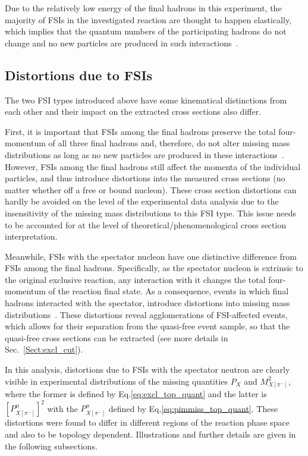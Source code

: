 \documentclass[prc,twocolumn,superscriptaddress,showpacs,amssymb,amsmath,amsfonts,aps,nofootinbib]{revtex4-1}
\begin{document}
Due to the relatively low energy of the final hadrons in this experiment, the majority of FSIs in the investigated reaction are thought to happen elastically, which implies that the quantum numbers of the participating hadrons do not change and no new particles are produced in such interactions~\cite{Shirokov_Yudin:1980}.  


\subsection{Distortions due to FSIs}
\label{Sect:fsi_probing}


The two FSI types introduced above have some kinematical distinctions from each other and their impact on the extracted cross sections also differ.%

First, it is important that FSIs among the final hadrons preserve the total four-momentum of all three final hadrons and, therefore, do not alter missing mass distributions as long as no new particles are produced in these interactions~\cite{my_thesis:2021}. However, FSIs among the final hadrons still affect the momenta of the individual particles, and thus introduce distortions into the measured cross sections (no matter whether off a free or bound nucleon). These cross section distortions can hardly be avoided on the level of the experimental data analysis due to the insensitivity of the missing mass distributions to this FSI type. This issue needs to be accounted for at the level of theoretical/phenomenological cross section interpretation.


Meanwhile, FSIs with the spectator nucleon have one distinctive difference from FSIs among the final hadrons. Specifically, as the spectator nucleon is extrinsic to the original exclusive reaction, any interaction with it changes the total four-momentum of the reaction final state. As a consequence, events in which final hadrons interacted with the spectator, introduce distortions into missing mass distributions~\cite{note_mm_distr}. These distortions reveal agglomerations of FSI-affected events, which allows for their separation from the quasi-free event sample, so that the quasi-free cross sections can be extracted (see more details in Sec.\!~\ref{Sect:excl_cut}). 



In this analysis, distortions due to FSIs with the spectator neutron are clearly visible in experimental distributions of the missing quantities $P_{X}$ and  $M^{2}_{X[\pi^{-}]}$, where the former is defined by Eq.\eqref{eq:excl_top_quant} and the latter is $[P_{X[\pi^{-}]}^{\mu}]^2$ with the $P_{X[\pi^{-}]}^{\mu}$ defined by Eq.\eqref{eq:pimmiss_top_quant}. These distortions were found to differ in different regions of the reaction phase space and also to be topology dependent. Illustrations and further details are given in the following subsections.%
\end{document}

